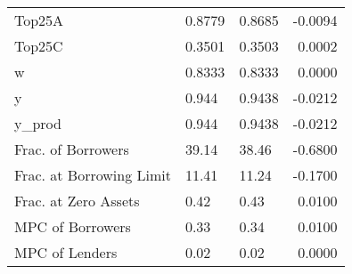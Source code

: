 \begin{table}
\begin{tabular}{lllr}
                  Top25A &  0.8779 &   0.8685 &  -0.0094 \\
                  Top25C &  0.3501 &   0.3503 &   0.0002 \\
                       w &  0.8333 &   0.8333 &   0.0000 \\
                       y &   0.944 &   0.9438 &  -0.0212 \\
                  y\_prod &   0.944 &   0.9438 &  -0.0212 \\
      Frac. of Borrowers &   39.14 &    38.46 &  -0.6800 \\
Frac. at Borrowing Limit &   11.41 &    11.24 &  -0.1700 \\
    Frac. at Zero Assets &    0.42 &     0.43 &   0.0100 \\
        MPC of Borrowers &    0.33 &     0.34 &   0.0100 \\
          MPC of Lenders &    0.02 &     0.02 &   0.0000 \\
\bottomrule
\end{tabular}
\end{table}
